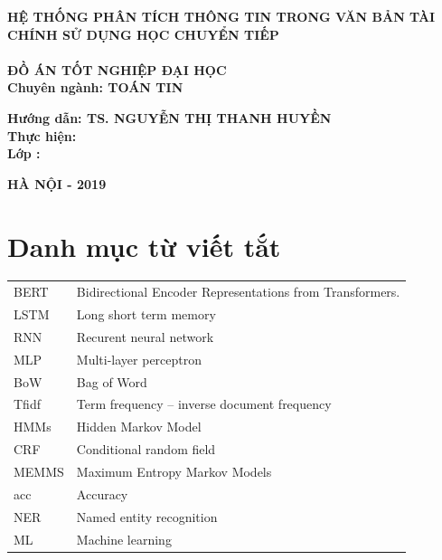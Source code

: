 \documentclass[14pt]{extreport}
\begin{document}
{\begin{center}
\textbf{{\large HỆ THỐNG PHÂN TÍCH THÔNG TIN TRONG VĂN BẢN TÀI CHÍNH SỬ DỤNG HỌC CHUYỂN TIẾP}}\\[1cm]
\textbf{{\large}}\\[1cm]
\textbf{{\large ĐỒ ÁN TỐT NGHIỆP ĐẠI HỌC
}}\\
\textbf{Chuyên ngành: {\large TOÁN TIN}}\\[0.2cm]
\end{center}
\begin{flushleft}
\hspace{0.5 cm} \textbf{ Hướng dẫn:{ TS. NGUYỄN THỊ THANH HUYỀN }}\\[0.2cm]
\hspace{0.5 cm} \textbf{ Thực hiện:\hspace{0.5cm}{NGUYỄN HỒNG SƠN}}\\
\hspace{0.5 cm} \textbf{ Lớp :\hspace{1.9 cm}{KSTN Toán tin K59}}\\

\end{flushleft}

\vspace{1.3cm}
\begin{center}
\textbf{{\large HÀ NỘI - 2019}}\\
\end{center}
}
\egroup



\chapter*{Danh mục từ viết tắt}

\begin{tabular}{l l }

BERT & Bidirectional Encoder Representations from Transformers.\\

LSTM & Long short term memory\\

RNN & Recurent neural network\\

MLP & Multi-layer perceptron \\

BoW & Bag of Word \\

Tfidf &  Term frequency – inverse document frequency\\

HMMs & Hidden Markov Model \\

CRF & Conditional random field \\

MEMMS & Maximum Entropy Markov Models \\

acc & Accuracy \\

NER & Named entity recognition \\

ML & Machine learning \\
\end{tabular}
\newpage
\end{document}
